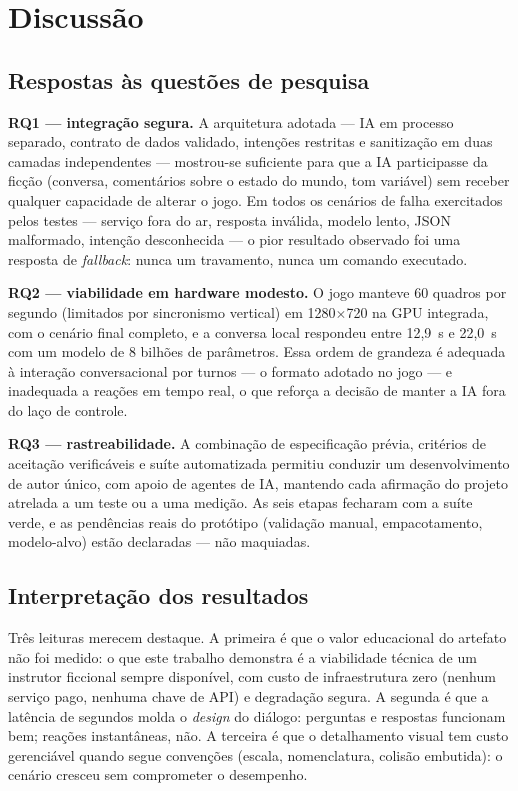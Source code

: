 \chapter{Discussão}
\label{cap:discussao}

\section{Respostas às questões de pesquisa}
\label{sec:respostas}

\textbf{RQ1 --- integração segura.} A arquitetura adotada --- IA em processo
separado, contrato de dados validado, intenções restritas e sanitização em
duas camadas independentes --- mostrou-se suficiente para que a IA
participasse da ficção (conversa, comentários sobre o estado do mundo, tom
variável) sem receber qualquer capacidade de alterar o jogo. Em todos os
cenários de falha exercitados pelos testes --- serviço fora do ar, resposta
inválida, modelo lento, JSON malformado, intenção desconhecida --- o pior
resultado observado foi uma resposta de \emph{fallback}: nunca um travamento,
nunca um comando executado.

\textbf{RQ2 --- viabilidade em hardware modesto.} O jogo manteve 60 quadros
por segundo (limitados por sincronismo vertical) em 1280$\times$720 na GPU
integrada, com o cenário final completo, e a conversa local respondeu entre
12,9~s e 22,0~s com um modelo de 8 bilhões de parâmetros. Essa ordem de
grandeza é adequada à interação conversacional por turnos --- o formato
adotado no jogo --- e inadequada a reações em tempo real, o que reforça a
decisão de manter a IA fora do laço de controle.

\textbf{RQ3 --- rastreabilidade.} A combinação de especificação prévia,
critérios de aceitação verificáveis e suíte automatizada permitiu conduzir um
desenvolvimento de autor único, com apoio de agentes de IA, mantendo cada
afirmação do projeto atrelada a um teste ou a uma medição. As seis etapas
fecharam com a suíte verde, e as pendências reais do protótipo (validação
manual, empacotamento, modelo-alvo) estão declaradas --- não maquiadas.

\section{Interpretação dos resultados}
\label{sec:interpretacao}

Três leituras merecem destaque. A primeira é que o valor educacional do
artefato não foi medido: o que este trabalho demonstra é a viabilidade
técnica de um instrutor ficcional sempre disponível, com custo de
infraestrutura zero (nenhum serviço pago, nenhuma chave de API) e degradação
segura. A segunda é que a latência de segundos molda o \emph{design} do
diálogo: perguntas e respostas funcionam bem; reações instantâneas, não. A
terceira é que o detalhamento visual tem custo gerenciável quando segue
convenções (escala, nomenclatura, colisão embutida): o cenário cresceu sem
comprometer o desempenho.

